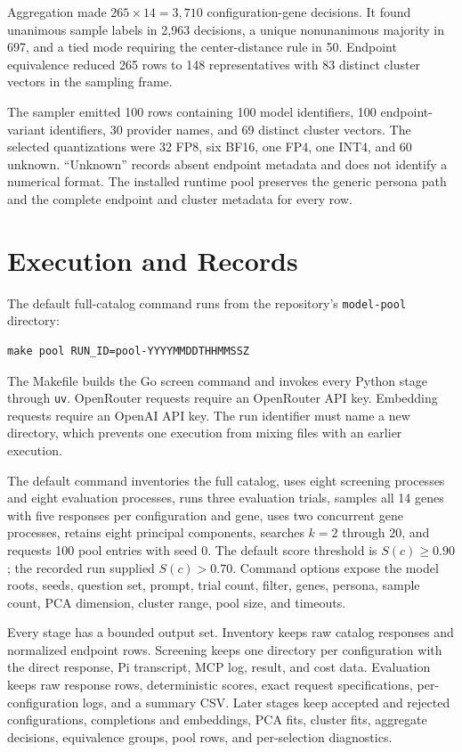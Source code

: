 \documentclass[11pt]{article}
\newcommand{\code}[1]{\texttt{#1}}
\begin{document}
Aggregation made $265\times14=3{,}710$ configuration-gene decisions.  It found unanimous sample labels in 2,963 decisions, a unique nonunanimous majority in 697, and a tied mode requiring the center-distance rule in 50.  Endpoint equivalence reduced 265 rows to 148 representatives with 83 distinct cluster vectors in the sampling frame.

The sampler emitted 100 rows containing 100 model identifiers, 100 endpoint-variant identifiers, 30 provider names, and 69 distinct cluster vectors.  The selected quantizations were 32 FP8, six BF16, one FP4, one INT4, and 60 unknown.  ``Unknown'' records absent endpoint metadata and does not identify a numerical format.  The installed runtime pool preserves the generic persona path and the complete endpoint and cluster metadata for every row.

\section{Execution and Records}

The default full-catalog command runs from the repository's \code{model-pool} directory:

\begin{verbatim}
make pool RUN_ID=pool-YYYYMMDDTHHMMSSZ
\end{verbatim}

The Makefile builds the Go screen command and invokes every Python stage through \code{uv}.  OpenRouter requests require an OpenRouter API key.  Embedding requests require an OpenAI API key.  The run identifier must name a new directory, which prevents one execution from mixing files with an earlier execution.

The default command inventories the full catalog, uses eight screening processes and eight evaluation processes, runs three evaluation trials, samples all 14 genes with five responses per configuration and gene, uses two concurrent gene processes, retains eight principal components, searches $k=2$ through $20$, and requests 100 pool entries with seed 0.  The default score threshold is $S(c)\geq0.90$; the recorded run supplied $S(c)>0.70$.  Command options expose the model roots, seeds, question set, prompt, trial count, filter, genes, persona, sample count, PCA dimension, cluster range, pool size, and timeouts.

Every stage has a bounded output set.  Inventory keeps raw catalog responses and normalized endpoint rows.  Screening keeps one directory per configuration with the direct response, Pi transcript, MCP log, result, and cost data.  Evaluation keeps raw response rows, deterministic scores, exact request specifications, per-configuration logs, and a summary CSV.  Later stages keep accepted and rejected configurations, completions and embeddings, PCA fits, cluster fits, aggregate decisions, equivalence groups, pool rows, and per-selection diagnostics.
\end{document}
